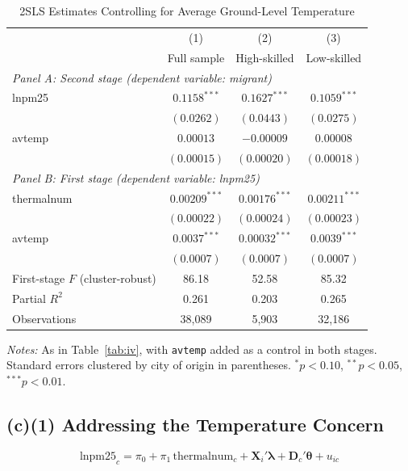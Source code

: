 \documentclass[11pt]{article}
\begin{document}
\begin{table}[H]
\centering
\begin{threeparttable}
\caption{2SLS Estimates Controlling for Average Ground-Level Temperature}
\label{tab:iv_temp}
\small
\begin{tabular}{lccc}
\toprule
 & (1) & (2) & (3) \\
 & Full sample & High-skilled & Low-skilled \\
\midrule
\multicolumn{4}{l}{\textit{Panel A: Second stage (dependent variable: migrant)}} \\
lnpm25 & $0.1158^{***}$ & $0.1627^{***}$ & $0.1059^{***}$ \\
 & $(0.0262)$ & $(0.0443)$ & $(0.0275)$ \\
avtemp & $0.00013$ & $-0.00009$ & $0.00008$ \\
 & $(0.00015)$ & $(0.00020)$ & $(0.00018)$ \\
\midrule
\multicolumn{4}{l}{\textit{Panel B: First stage (dependent variable: lnpm25)}} \\
thermalnum & $0.00209^{***}$ &  $0.00176^{***}$ & $0.00211^{***}$ \\
 & $(0.00022)$ & $(0.00024)$ & $(0.00023)$ \\
avtemp & $0.0037^{***}$ & $0.00032^{***}$ & $0.0039^{***}$ \\
 & $(0.0007)$ & $(0.0007)$ & $(0.0007)$ \\
First-stage $F$ (cluster-robust) & 86.18 & 52.58 & 85.32 \\
Partial $R^2$ & 0.261 & 0.203 & 0.265 \\
\midrule
Observations & 38,089 & 5,903 & 32,186 \\
\bottomrule
\end{tabular}
\begin{tablenotes}\footnotesize
\item \textit{Notes:} As in Table~\ref{tab:iv}, with \texttt{avtemp} added as a control in both stages. Standard errors clustered by city of origin in parentheses. $^{*}p<0.10$, $^{**}p<0.05$, $^{***}p<0.01$.
\end{tablenotes}
\end{threeparttable}
\end{table}

\subsection*{(c)(1) Addressing the Temperature Concern}
\begin{equation}
\label{eq:ols}
\text{lnpm25}_c = \pi_0 + \pi_1 \,\text{thermalnum}_c + \mathbf{X}_i'\boldsymbol{\lambda} + \mathbf{D}_c'\boldsymbol{\theta} + u_{ic}
\end{equation}
\end{document}
